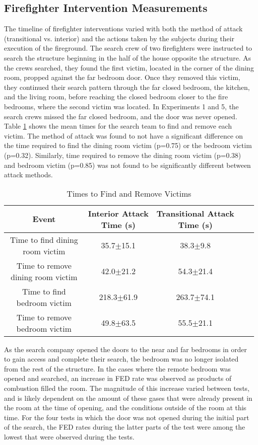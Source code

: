 \documentclass[12pt,oneside]{book}
\begin{document}
\subsection{Firefighter Intervention Measurements}
The timeline of firefighter interventions varied with both the method of attack (transitional vs. interior) and the actions taken by the subjects during their execution of the fireground. The search crew of two firefighters were instructed to search the structure beginning in the half of the house opposite the structure. As the crews searched, they found the first victim, located in the corner of the dining room, propped against the far bedroom door. Once they removed this victim, they continued their search pattern through the far closed bedroom, the kitchen, and the living room, before reaching the closed bedroom closer to the fire bedrooms, where the second victim was located. In Experiments 1 and 5, the search crews missed the far closed bedroom, and the door was never opened. Table \ref{tab:victim_times} shows the mean times for the search team to find and remove each victim. The method of attack was found to not have a significant difference on the time required to find the dining room victim (p=0.75) or the bedroom victim (p=0.32). Similarly, time required to remove the dining room victim (p=0.38) and bedroom victim (p=0.85) was not found to be significantly different between attack methods. 

\begin{table}[!ht]
    \centering
    \caption{Times to Find and Remove Victims}
    \label{tab:victim_times}
    \begin{tabular}{ccccc}
    \toprule[1.5pt]
 	 Event&								Interior Attack Time (s)&	Transitional Attack Time (s)\\
 	\midrule 
  	Time to find dining room victim&	35.7$\pm$15.1&				38.3$\pm$9.8\\
  	Time to remove dining room victim&	42.0$\pm$21.2&				54.3$\pm$21.4\\
  	Time to find bedroom victim&		218.3$\pm$61.9&				263.7$\pm$74.1\\
  	Time to remove bedroom victim&		49.8$\pm$63.5&				55.5$\pm$21.1\\
 	\bottomrule[1.25pt] 
    \end{tabular}
\end{table}

As the search company opened the doors to the near and far bedrooms in order to gain access and complete their search, the bedroom was no longer isolated from the rest of the structure. In the cases where the remote bedroom was opened and searched, an increase in FED rate was observed as products of combustion filled the room. The magnitude of this increase varied between tests, and is likely dependent on the amount of these gases that were already present in the room at the time of opening, and the conditions outside of the room at this time.  For the four tests in which the door was not opened during the initial part of the search, the FED rates during the latter parts of the test were among the lowest that were observed during the tests. 
\end{document}

